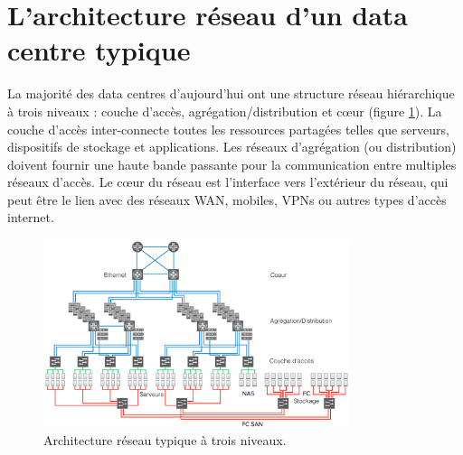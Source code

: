 \section{L'architecture réseau d'un data centre typique}

La majorité des data centres d'aujourd'hui ont une structure réseau hiérarchique à trois niveaux : couche d'accès, agrégation/distribution et cœur (figure \ref{legacy_archi}). La couche d'accès inter-connecte toutes les ressources partagées telles que serveurs, dispositifs de stockage et applications. Les réseaux d'agrégation (ou distribution) doivent fournir une haute bande passante pour la communication entre multiples réseaux d'accès. Le cœur du réseau est l'interface vers l'extérieur du réseau, qui peut être le lien avec des réseaux WAN, mobiles, VPNs ou autres types d'accès internet. \\



\begin{figure}[h]
\begin{center}
\includegraphics[width=0.8\textwidth]{images/LegacyNetworkArchitecture} 
\caption{Architecture réseau typique à trois niveaux. \cite{cloudReadyNetworkJuniper}} \label{legacy_archi}
\end{center}
\end{figure}



